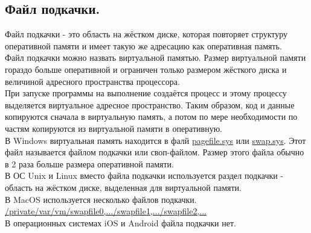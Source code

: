 \documentclass[a4paper]{article}
\begin{document}
\subsection{Файл подкачки.}
Файл подкачки - это область на жёстком диске, которая повторяет структуру оперативной памяти и имеет такую же адресацию как оперативная память.\\
Файл подкачки можно назвать виртуальной памятью. Размер виртуальной памяти гораздо больше оперативной и ограничен только размером жёсткого диска и величиной адресного пространства процессора.\\
При запуске программы на выполнение создаётся процесс и этому процессу выделяется виртуальное адресное пространство. Таким образом, код и данные копируются сначала в виртуальную память, а потом по мере необходимости по частям копируются из виртуальной памяти в оперативную.\\
В Windows виртуальная память находится в фалй \url{pagefile.sys} или \url{swap.sys}. Этот файл называется файлом подкачки или своп-файлом. Размер этого файла обычно в 2 раза больше размера оперативной памяти.\\
В ОС Unix и Linux вместо файла подкачки используется раздел подкачки - область на жёстком диске, выделенная для виртуальной памяти.\\
В MacOS используется несколько файлов подкачки.\\
\url{/private/var/vm/swapfile0,.../swapfile1,.../swapfile2,...}\\
В операционных системах iOS и Android файла подкачки нет.\\
\end{document}
